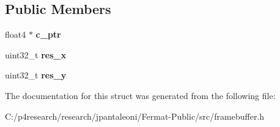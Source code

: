 \subsection*{Public Members}
\begin{DoxyCompactItemize}
\item 
\mbox{\label{struct_f_buffer_channel_view_a4d7c34a0fb5d174093147fd4d8c9f33f}} 
float4 $\ast$ {\bfseries c\+\_\+ptr}
\item 
\mbox{\label{struct_f_buffer_channel_view_abbdde4f6883fa3d082cb39e713f96ae3}} 
uint32\+\_\+t {\bfseries res\+\_\+x}
\item 
\mbox{\label{struct_f_buffer_channel_view_a8b500a1a6086870c8bba6028a34aa795}} 
uint32\+\_\+t {\bfseries res\+\_\+y}
\end{DoxyCompactItemize}


The documentation for this struct was generated from the following file\+:\begin{DoxyCompactItemize}
\item 
C\+:/p4research/research/jpantaleoni/\+Fermat-\/\+Public/src/framebuffer.\+h\end{DoxyCompactItemize}
